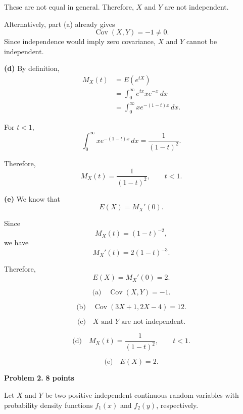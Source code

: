 \documentclass[11pt]{article}
\begin{document}
\begin{solutionbox}
These are not equal in general. Therefore, \(X\) and \(Y\) are not
independent.

Alternatively, part (a) already gives
\[
\operatorname{Cov}(X,Y)=-1\neq0.
\]
Since independence would imply zero covariance, \(X\) and \(Y\) cannot be
independent.


\textbf{(d)} By definition,
\begin{align*}
M_X(t)
&=
E(e^{tX})\\
&=
\int_0^\infty e^{tx}xe^{-x}\,dx\\
&=
\int_0^\infty xe^{-(1-t)x}\,dx.
\end{align*}

For \(t<1\),
\[
\int_0^\infty xe^{-(1-t)x}\,dx
=
\frac{1}{(1-t)^2}.
\]

Therefore,
\[
M_X(t)
=
\frac{1}{(1-t)^2},
\qquad t<1.
\]


\textbf{(e)} We know that
\[
E(X)=M_X'(0).
\]

Since
\[
M_X(t)=(1-t)^{-2},
\]
we have
\[
M_X'(t)=2(1-t)^{-3}.
\]

Therefore,
\[
E(X)
=
M_X'(0)
=
2.
\]

 

\begin{finalanswerbox}

\[
\text{(a)}\quad \operatorname{Cov}(X,Y)=-1.
\]

\[
\text{(b)}\quad
\operatorname{Cov}(3X+1,2X-4)=12.
\]

\[
\text{(c)}\quad X\text{ and }Y\text{ are not independent.}
\]

\[
\text{(d)}\quad
M_X(t)=\frac{1}{(1-t)^2},
\qquad t<1.
\]

\[
\text{(e)}\quad E(X)=2.
\]
 

\end{finalanswerbox}

\end{solutionbox}


\newpage


\begin{problemheader}
\textbf{Problem 2.} \hfill \textbf{8 points}
\end{problemheader}

Let \(X\) and \(Y\) be two positive independent continuous random variables
with probability density functions \(f_1(x)\) and \(f_2(y)\), respectively.
\end{document}
